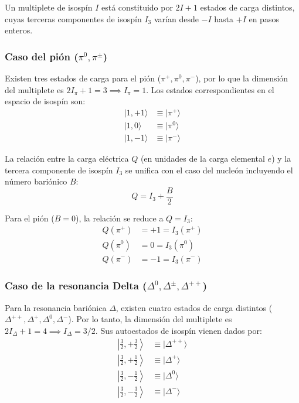 Un multiplete de isospín $I$ está constituido por $2I + 1$ estados de carga distintos, cuyas terceras componentes de isospín $I_3$ varían desde $-I$ hasta $+I$ en pasos enteros.

\subsubsection*{Caso del pión ($\pi^0, \pi^\pm$)}

Existen tres estados de carga para el pión ($\pi^+, \pi^0, \pi^-$), por lo que la dimensión del multiplete es $2I_\pi + 1 = 3 \implies I_\pi = 1$. Los estados correspondientes en el espacio de isospín son:
\begin{align}
    |1, +1\rangle &\equiv |\pi^+\rangle \\
    |1, 0\rangle &\equiv |\pi^0\rangle \\
    |1, -1\rangle &\equiv |\pi^-\rangle
\end{align}

La relación entre la carga eléctrica $Q$ (en unidades de la carga elemental $e$) y la tercera componente de isospín $I_3$ se unifica con el caso del nucleón incluyendo el número bariónico $B$:
\begin{equation}
    Q = I_3 + \frac{B}{2}
\end{equation}

Para el pión ($B = 0$), la relación se reduce a $Q = I_3$:
\begin{align}
    Q(\pi^+) &= +1 = I_3(\pi^+) \\
    Q(\pi^0) &= 0 = I_3(\pi^0) \\
    Q(\pi^-) &= -1 = I_3(\pi^-)
\end{align}

\subsubsection*{Caso de la resonancia Delta ($\Delta^0, \Delta^\pm, \Delta^{++}$)}

Para la resonancia bariónica $\Delta$, existen cuatro estados de carga distintos ($\Delta^{++}, \Delta^+, \Delta^0, \Delta^-$). Por lo tanto, la dimensión del multiplete es $2I_\Delta + 1 = 4 \implies I_\Delta = 3/2$. Sus autoestados de isospín vienen dados por:
\begin{align}
    \left| \frac{3}{2}, +\frac{3}{2} \right\rangle &\equiv |\Delta^{++}\rangle \\
    \left| \frac{3}{2}, +\frac{1}{2} \right\rangle &\equiv |\Delta^+\rangle \\
    \left| \frac{3}{2}, -\frac{1}{2} \right\rangle &\equiv |\Delta^0\rangle \\
    \left| \frac{3}{2}, -\frac{3}{2} \right\rangle &\equiv |\Delta^-\rangle
\end{align}

